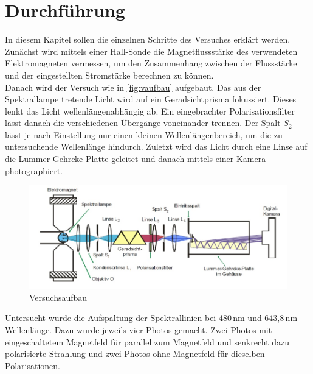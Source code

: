 \section{Durchführung}
\label{sec:Durchfuehrung}
In diesem Kapitel sollen die einzelnen Schritte des Versuches erklärt werden.\\

Zunächst wird mittels einer Hall-Sonde die Magnetflussstärke des verwendeten Elektromagneten vermessen, um den Zusammenhang zwischen der Flussstärke und der eingestellten Stromstärke berechnen zu können.\\
Danach wird der Versuch wie in \autoref{fig:vaufbau} aufgebaut.
Das aus der Spektrallampe tretende Licht wird auf ein Geradsichtprisma fokussiert.
Dieses lenkt das Licht wellenlängenabhängig ab.
Ein eingebrachter Polarisationsfilter lässt danach die verschiedenen Übergänge voneinander trennen.
Der Spalt $S_2$ lässt je nach Einstellung nur einen kleinen Wellenlängenbereich, um die zu untersuchende Wellenlänge hindurch.
Zuletzt wird das Licht durch eine Linse auf die Lummer-Gehrcke Platte geleitet und danach mittels einer Kamera photographiert.

\begin{figure}
\includegraphics{content/grafiken/Aufbau.jpg}
\caption{Versuchsaufbau}
\label{fig:vaufbau}
\end{figure}

Untersucht wurde die Aufspaltung der Spektrallinien bei 480\,nm und 643,8\,nm Wellenlänge. Dazu wurde jeweils vier Photos gemacht.
Zwei Photos mit eingeschaltetem Magnetfeld für parallel zum Magnetfeld und senkrecht dazu polarisierte Strahlung und zwei Photos ohne Magnetfeld für dieselben Polarisationen.
